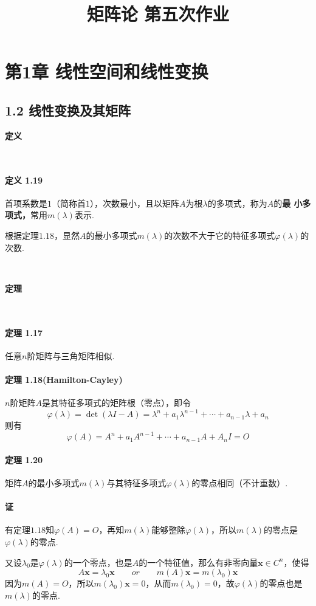 \documentclass[12pt, a4paper, oneside, fontset=none]{ctexart}
\author{}
\date{}
\title{\vspace{-3em}\textbf{矩阵论 \quad 第五次作业}\vspace{-3em}}
\begin{document}
\maketitle

\section*{第1章 \quad 线性空间和线性变换}

\subsection*{1.2 \quad 线性变换及其矩阵}

\centerline{\large{\textbf{定义}}} \ \par

\paragraph*{定义 1.19} 首项系数是$1$（简称首$1$），次数最小，且以矩阵$A$为根$\lambda$的多项式，称为$A$的\textbf{最
    小多项式，}常用$m(\lambda)$表示. \par
根据定理$1.18$，显然$A$的最小多项式$m(\lambda)$的次数不大于它的特征多项式$\varphi(\lambda)$的次数. \par \ \par

\centerline{\large{\textbf{定理}}} \ \par

\paragraph*{定理 1.17} 任意$n$阶矩阵与三角矩阵相似.

\paragraph*{定理 1.18(Hamilton-Cayley)} $n$阶矩阵$A$是其特征多项式的矩阵根（零点），即令
\[
    \varphi(\lambda) = \det(\lambda I - A) = \lambda^n + a_1\lambda^{n-1} + \cdots + a_{n-1}\lambda + a_n
\]
则有
\[
    \varphi(A) = A^n + a_1A^{n-1} + \cdots + a_{n-1}A + A_nI = O
\]

\paragraph*{定理 1.20} 矩阵$A$的最小多项式$m(\lambda)$与其特征多项式$\varphi(\lambda)$的零点相同（不计重数）.
\paragraph*{证} 有定理$1.18$知$\varphi(A) = O$，再知$m(\lambda)$能够整除$\varphi(\lambda)$，所以$m(\lambda)$的零点是
$\varphi(\lambda)$的零点. \par
又设$\lambda_0$是$\varphi(\lambda)$的一个零点，也是$A$的一个特征值，那么有非零向量$\bm{x}\in C^n$，使得
\[
    A\bm{x} = \lambda_0 \bm{x} \qquad or \qquad m(A)\bm{x} = m(\lambda_0) \bm{x}
\]
因为$m(A) = O$，所以$m(\lambda_0)\bm{x} = 0$，从而$m(\lambda_0) = 0$，故$\varphi(\lambda)$的零点也是$m(\lambda)$的零点.
\end{document}
